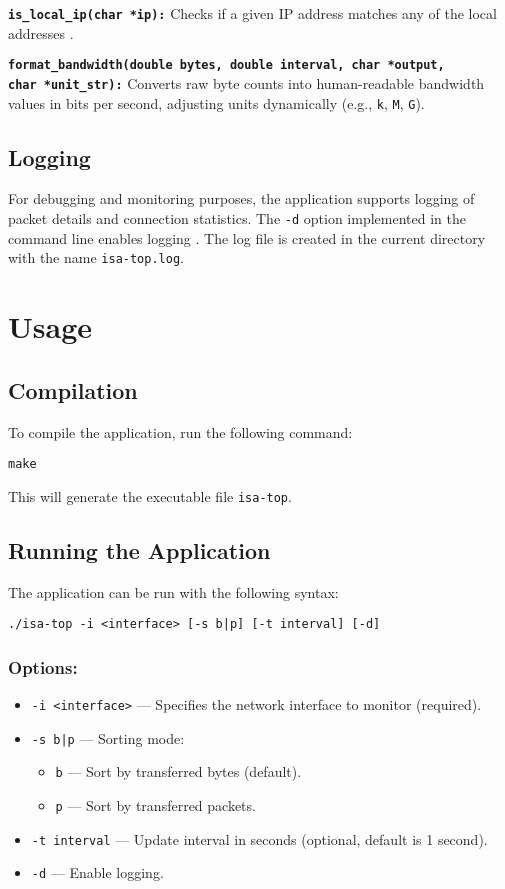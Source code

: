 \documentclass[12pt]{extarticle}
\begin{document}
\textbf{\texttt{is\_local\_ip(char *ip):}} Checks if a given IP address matches any of the local addresses \cite{beej}.

\textbf{\texttt{format\_bandwidth(double bytes, double interval, char *output,}}\\
\textbf{\texttt{char *unit\_str):}} Converts raw byte counts into human-readable bandwidth values in bits per second, adjusting units dynamically (e.g., \texttt{k}, \texttt{M}, \texttt{G}).


\subsection{Logging}

For debugging and monitoring purposes, the application supports logging of packet details and connection statistics. The \texttt{-d} option implemented in the command line enables logging \cite{libpcap}. The log file is created in the current directory with the name \texttt{isa-top.log}.

\section{Usage}

\subsection{Compilation}
To compile the application, run the following command:
\begin{verbatim}
make
\end{verbatim}
This will generate the executable file \texttt{isa-top}.

\subsection{Running the Application}
The application can be run with the following syntax:
\begin{verbatim}
./isa-top -i <interface> [-s b|p] [-t interval] [-d]
\end{verbatim}

\subsubsection*{Options:}
\begin{itemize}
    \item \texttt{-i <interface>} — Specifies the network interface to monitor (required).
    \item \texttt{-s b|p} — Sorting mode:
    \begin{itemize}
        \item \texttt{b} — Sort by transferred bytes (default).
        \item \texttt{p} — Sort by transferred packets.
    \end{itemize}
    \item \texttt{-t interval} — Update interval in seconds (optional, default is 1 second).
    \item \texttt{-d} — Enable logging.
\end{itemize}
\end{document}
